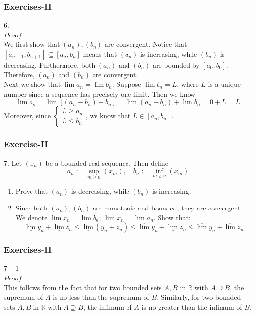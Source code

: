 \documentclass[12pt, t]{beamer}
\begin{document}
\begin{frame}
    \frametitle{Exercises-II}
6.\\
$Proof$ : \\
\hspace{1em} We first show that $(a_n),(b_n)$ are convergent. Notice that $[a_{n+1}, b_{n+1}]\subseteq [a_n,b_n]$ 
means that $(a_n)$ is increasing, while $(b_n)$ is decreasing. Furthermore, both $(a_n)$ and $(b_n)$ are bounded by 
$[a_0,b_0]$. Therefore, $(a_n)$ and $(b_n)$ are convergent.\\
\hspace{1em} Next we show that $\lim a_n=\lim b_n$. Suppose $\lim b_n=L$, where $L$ is a unique number since a sequence 
has precisely one limit. Then we know 
\begin{equation*}
    \lim a_n=\lim [(a_n-b_n)+b_n]=\lim (a_n-b_n) + \lim b_n= 0+L=L
\end{equation*}
Moreover, since 
$\begin{cases}
    L \geq a_n\\
    L \leq b_n
\end{cases}$, we know that $L\in [a_n,b_n]$.

\end{frame}

\begin{frame}
    \frametitle{Exercise-II}
7. Let $(x_n)$ be a bounded real sequence. Then define
\begin{equation*}
     a_n:=\sup_{m\geq n}(x_m),\quad b_n:=\inf_{m\geq n}(x_m) 
\end{equation*}

\begin{enumerate}
    \item Prove that $(a_n)$ is decreasing, while $(b_n)$ is increasing.
    \item Since both $(a_n),(b_n)$ are monotonic and bounded, they are convergent. 
        We denote $\underline{\lim} x_n=\lim b_n$; $\overline{\lim}x_n=\lim a_n$. Show that:
        \begin{equation*}
            \underline{\lim}y_n+\underline{\lim}z_n\leq \underline{\lim} (y_n+z_n)\leq\overline{\lim}y_n+\underline{\lim}z_n\leq\overline{\lim}y_n+\overline{\lim}z_n
        \end{equation*}
\end{enumerate}
\end{frame}

\begin{frame}
    \frametitle{Exercises-II}
7 -- 1\\
$Proof$ : \\
\hspace{1em} This follows from the fact that for two bounded sets $A,B$ in $\mathbb{R}$ with $A\supseteq B$, the supremum of $A$ is no less than 
the supremum of $B$.  Similarly, for two bounded sets $A,B$ in $\mathbb{R}$ with $A\supseteq B$, the infimum of $A$ is no greater than the infimum of $B$.


\end{frame}
\end{document}
